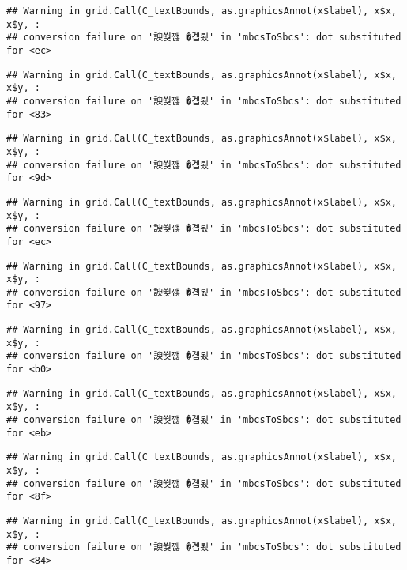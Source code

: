 \documentclass[
]{article}
\begin{document}
\begin{verbatim}
## Warning in grid.Call(C_textBounds, as.graphicsAnnot(x$label), x$x, x$y, :
## conversion failure on '諛쒖깮 �곕룄' in 'mbcsToSbcs': dot substituted for <ec>
\end{verbatim}

\begin{verbatim}
## Warning in grid.Call(C_textBounds, as.graphicsAnnot(x$label), x$x, x$y, :
## conversion failure on '諛쒖깮 �곕룄' in 'mbcsToSbcs': dot substituted for <83>
\end{verbatim}

\begin{verbatim}
## Warning in grid.Call(C_textBounds, as.graphicsAnnot(x$label), x$x, x$y, :
## conversion failure on '諛쒖깮 �곕룄' in 'mbcsToSbcs': dot substituted for <9d>
\end{verbatim}

\begin{verbatim}
## Warning in grid.Call(C_textBounds, as.graphicsAnnot(x$label), x$x, x$y, :
## conversion failure on '諛쒖깮 �곕룄' in 'mbcsToSbcs': dot substituted for <ec>
\end{verbatim}

\begin{verbatim}
## Warning in grid.Call(C_textBounds, as.graphicsAnnot(x$label), x$x, x$y, :
## conversion failure on '諛쒖깮 �곕룄' in 'mbcsToSbcs': dot substituted for <97>
\end{verbatim}

\begin{verbatim}
## Warning in grid.Call(C_textBounds, as.graphicsAnnot(x$label), x$x, x$y, :
## conversion failure on '諛쒖깮 �곕룄' in 'mbcsToSbcs': dot substituted for <b0>
\end{verbatim}

\begin{verbatim}
## Warning in grid.Call(C_textBounds, as.graphicsAnnot(x$label), x$x, x$y, :
## conversion failure on '諛쒖깮 �곕룄' in 'mbcsToSbcs': dot substituted for <eb>
\end{verbatim}

\begin{verbatim}
## Warning in grid.Call(C_textBounds, as.graphicsAnnot(x$label), x$x, x$y, :
## conversion failure on '諛쒖깮 �곕룄' in 'mbcsToSbcs': dot substituted for <8f>
\end{verbatim}

\begin{verbatim}
## Warning in grid.Call(C_textBounds, as.graphicsAnnot(x$label), x$x, x$y, :
## conversion failure on '諛쒖깮 �곕룄' in 'mbcsToSbcs': dot substituted for <84>
\end{verbatim}
\end{document}
